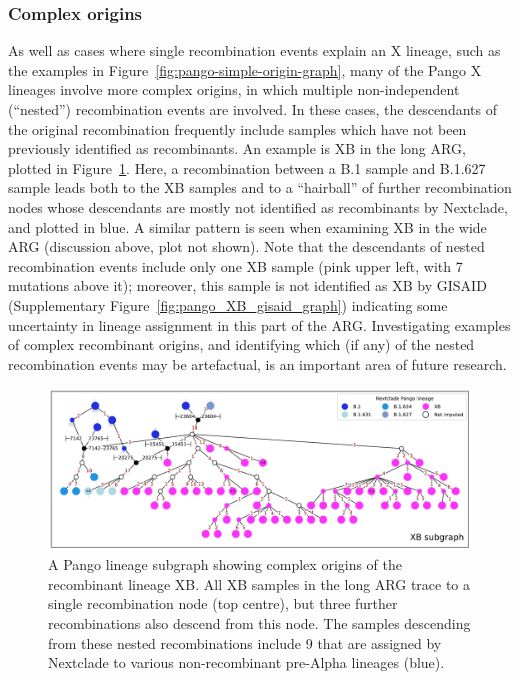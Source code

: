 \documentclass{article}
\begin{document}
\subsubsection{Complex origins}
As well as cases where single recombination events explain an X lineage,
such as the examples in Figure~\ref{fig:pango-simple-origin-graph}, many of the
Pango X lineages involve more complex origins,
in which multiple non-independent (``nested'') recombination events are involved.
In these cases, the descendants of the original recombination
frequently include samples which have not been previously identified as recombinants.
An example is XB in the long ARG,
plotted in Figure~\ref{fig:complex_origins_graph}. Here, a recombination
between a B.1 sample and B.1.627 sample leads both to the XB samples and to a
``hairball'' of further recombination nodes whose descendants are mostly not
identified as recombinants by Nextclade, and plotted in blue. A similar
pattern is seen when examining XB in the wide ARG (discussion above, plot not shown).
Note that the descendants of nested recombination events include only one
XB sample (pink upper left, with 7 mutations above it); moreover, this sample is
not identified as XB by GISAID (Supplementary Figure~\ref{fig:pango_XB_gisaid_graph})
indicating some uncertainty in lineage assignment in this part of the ARG.
Investigating examples of complex recombinant origins, and identifying which
(if any) of the nested recombination events may be artefactual, is an important
area of future research.

\begin{figure} \centering
\includegraphics[width=\textwidth]{figures/Pango_XB_nxcld_tight_graph.pdf}
\caption{\label{fig:complex_origins_graph}  A Pango lineage subgraph showing
complex origins of the recombinant lineage XB. All XB samples in the long ARG
trace to a single recombination node (top centre), but three further recombinations
also descend from this node. The samples descending from these nested
recombinations include 9 that are assigned by Nextclade to
various non-recombinant pre-Alpha lineages (blue).}
\end{figure}
\end{document}
